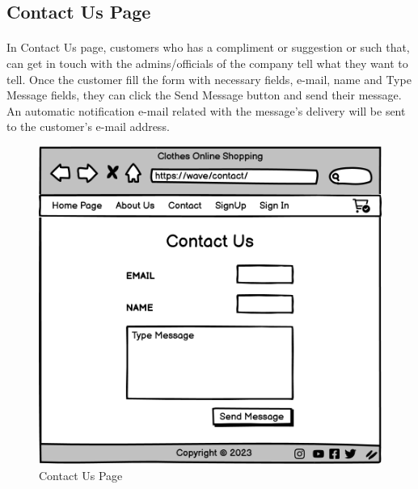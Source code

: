 \subsection{Contact Us Page}
\bigskip
\paragraph{}
In Contact Us page, customers who has a compliment or suggestion or such that, can get in touch with the admins/officials of the company tell what they want to tell. Once the customer fill the form with necessary fields, e-mail, name and Type Message fields, they can click the Send Message button and send their message. An automatic notification e-mail related with the message's delivery will be sent to the customer's e-mail address. 
\bigskip
\bigskip
\bigskip
\begin{figure}[h]
\centerline{\includegraphics[scale=1.]{images/Contact Us.png}}
\caption{Contact Us Page}
\label{fig}
\end{figure}